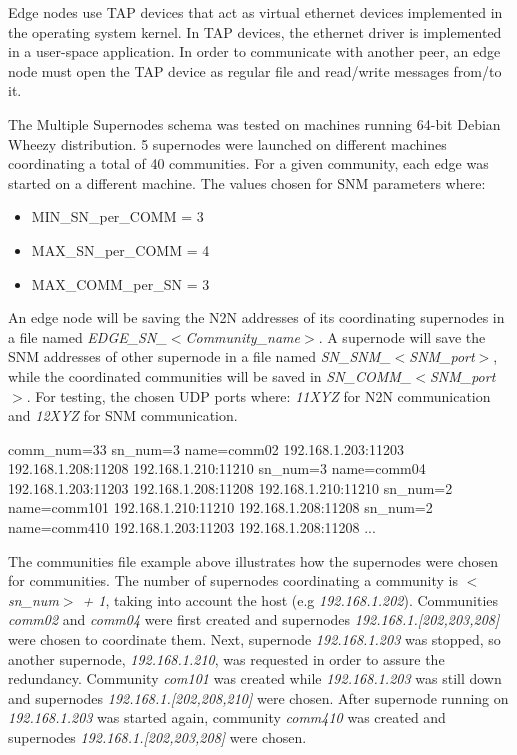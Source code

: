 
Edge nodes use TAP \cite{tuntap} devices that act as virtual ethernet devices implemented in the operating system kernel. In TAP devices, the ethernet driver is implemented in a user-space application. In order to communicate with another peer, an edge node must open the TAP device as regular file and read/write messages from/to it. 

The Multiple Supernodes schema was tested on machines running 64-bit Debian Wheezy distribution. 5 supernodes were launched on different machines coordinating a total of 40 communities. For a given community, each edge was started on a different machine.
The values chosen for SNM parameters where:

\begin{itemize}
\item MIN_SN_per_COMM = 3
\item MAX_SN_per_COMM = 4
\item MAX_COMM_per_SN = 3
\end{itemize}

An edge node will be saving the N2N addresses of its coordinating supernodes in a file named \emph{EDGE_SN_$<$Community_name$>$}. A supernode will save the SNM addresses of other supernode in a file named \emph{SN_SNM_$<$SNM_port$>$}, while the coordinated communities will be saved in \emph{SN_COMM_$<$SNM_port$>$}. For testing, the chosen UDP ports where: \emph{11XYZ} for N2N communication and \emph{12XYZ} for SNM communication.

\begin{file-content}[caption={Communities file \emph{SN_COMM_12202} for supernode listening on \emph{192.168.0.202:11202}}]
comm_num=33
sn_num=3 name=comm02
	192.168.1.203:11203
	192.168.1.208:11208
	192.168.1.210:11210
sn_num=3 name=comm04
	192.168.1.203:11203
	192.168.1.208:11208
	192.168.1.210:11210
sn_num=2 name=comm101
	192.168.1.210:11210
	192.168.1.208:11208
sn_num=2 name=comm410
	192.168.1.203:11203
	192.168.1.208:11208
...
\end{file-content}

The communities file example above illustrates how the supernodes were chosen for communities. The number of supernodes coordinating a community is \emph{$<$sn_num$>$ + 1}, taking into account the host (e.g \emph{192.168.1.202}).
Communities \emph{comm02} and \emph{comm04} were first created and supernodes \emph{192.168.1.[202,203,208]} were chosen to coordinate them. Next, supernode \emph{192.168.1.203} was stopped, so another supernode, \emph{192.168.1.210}, was requested in order to assure the redundancy. Community \emph{com101} was created while \emph{192.168.1.203} was still down and supernodes \emph{192.168.1.[202,208,210]} were chosen. After supernode running on \emph{192.168.1.203} was started again, community \emph{comm410} was created and supernodes \emph{192.168.1.[202,203,208]} were chosen.